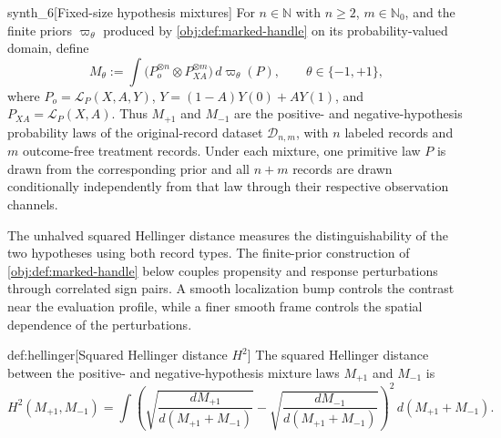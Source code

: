 \documentclass[11pt]{article}
\begin{document}
\begin{definitionv}{synth_6}[Fixed-size hypothesis mixtures]
For \(n\in\mathbb N\) with \(n\ge2\), \(m\in\mathbb N_0\), and the finite priors \(\varpi_\theta\) produced by \cref{obj:def:marked-handle} on its probability-valued domain, define
\[
M_\theta
:=\int\bigl(P_o^{\otimes n}\otimes P_{XA}^{\otimes m}\bigr)\,d\varpi_\theta(P),
\qquad \theta\in\{-1,+1\},
\]
where \(P_o=\mathcal L_P(X,A,Y)\), \(Y=(1-A)Y(0)+AY(1)\), and \(P_{XA}=\mathcal L_P(X,A)\). Thus \(M_{+1}\) and \(M_{-1}\) are the positive- and negative-hypothesis probability laws of the original-record dataset \(\mathcal D_{n,m}\), with \(n\) labeled records and \(m\) outcome-free treatment records. Under each mixture, one primitive law \(P\) is drawn from the corresponding prior and all \(n+m\) records are drawn conditionally independently from that law through their respective observation channels.
\end{definitionv}

The unhalved squared Hellinger distance  measures the distinguishability of the two hypotheses using both record types. The finite-prior construction  of \cref{obj:def:marked-handle} below couples propensity and response perturbations through correlated sign pairs. A smooth localization bump controls the contrast near the evaluation profile, while a finer smooth frame controls the spatial dependence of the perturbations.

\begin{definitionv}{def:hellinger}[Squared Hellinger distance \(H^2\)]
The squared Hellinger distance between the positive- and negative-hypothesis mixture laws \(M_{+1}\) and \(M_{-1}\) is
\[
H^2(M_{+1},M_{-1})
=
\int
\left(
\sqrt{\frac{dM_{+1}}{d(M_{+1}+M_{-1})}}
-
\sqrt{\frac{dM_{-1}}{d(M_{+1}+M_{-1})}}
\right)^2
\,d(M_{+1}+M_{-1}).
\]
\end{definitionv}
\end{document}
